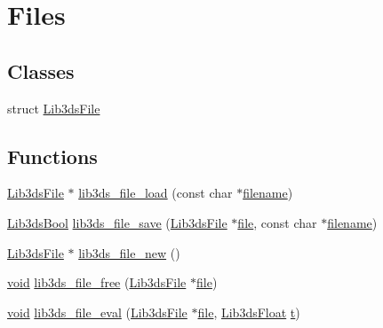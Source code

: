\hypertarget{group__file}{\section{Files}
\label{group__file}
}
\subsection*{Classes}
\begin{DoxyCompactItemize}
\item 
struct \hyperlink{struct_lib3ds_file}{Lib3ds\-File}
\end{DoxyCompactItemize}
\subsection*{Functions}
\begin{DoxyCompactItemize}
\item 
\hyperlink{struct_lib3ds_file}{Lib3ds\-File} $\ast$ \hyperlink{group__file_ga6b9d2aaebd3b867bc12a45ebab02c576}{lib3ds\-\_\-file\-\_\-load} (const char $\ast$\hyperlink{ioapi_8h_a7a03a664b090ce5c848ecb31cb4a2fa8}{filename})
\item 
\hyperlink{types_8h_a89dd7398a9ebbbf28011f8c32df67ad3}{Lib3ds\-Bool} \hyperlink{group__file_ga75c8285e4cfc2353480f196ecad8670e}{lib3ds\-\_\-file\-\_\-save} (\hyperlink{struct_lib3ds_file}{Lib3ds\-File} $\ast$\hyperlink{uavobjecttemplate_8m_a97c04efa65bcf0928abf9260bc5cbf46}{file}, const char $\ast$\hyperlink{ioapi_8h_a7a03a664b090ce5c848ecb31cb4a2fa8}{filename})
\item 
\hyperlink{struct_lib3ds_file}{Lib3ds\-File} $\ast$ \hyperlink{group__file_ga773b2b5c10d39fde21a4c48fe4d7fd11}{lib3ds\-\_\-file\-\_\-new} ()
\item 
\hyperlink{group___u_a_v_objects_plugin_ga444cf2ff3f0ecbe028adce838d373f5c}{void} \hyperlink{group__file_ga9c8f6dd2fdb1a437f924b3d7a09fabdb}{lib3ds\-\_\-file\-\_\-free} (\hyperlink{struct_lib3ds_file}{Lib3ds\-File} $\ast$\hyperlink{uavobjecttemplate_8m_a97c04efa65bcf0928abf9260bc5cbf46}{file})
\item 
\hyperlink{group___u_a_v_objects_plugin_ga444cf2ff3f0ecbe028adce838d373f5c}{void} \hyperlink{group__file_gab80a3335426e04312cac579d4614f3f0}{lib3ds\-\_\-file\-\_\-eval} (\hyperlink{struct_lib3ds_file}{Lib3ds\-File} $\ast$\hyperlink{uavobjecttemplate_8m_a97c04efa65bcf0928abf9260bc5cbf46}{file}, \hyperlink{types_8h_ab18e70f51f9a53c9dee8d930c8e1a7bf}{Lib3ds\-Float} \hyperlink{glext_8h_a00140d6f5c548b26daf170bf16e86a6d}{t})
\item 

\end{DoxyCompactItemize}
